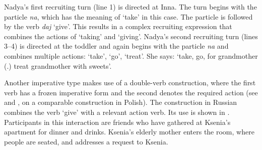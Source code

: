 \documentclass[output=paper,modfonts,nonflat]{langsci/langscibook}
\begin{document}
Nadya's first recruiting turn (line 1) is directed at Inna. The turn begins with the particle \textit{na}, which has the meaning of ‘take’ in this case. The particle is followed by the verb \textit{daj} ‘give’. This results in a complex recruiting expression that combines the actions of ‘taking’ and ‘giving’. Nadya's second recruiting turn (lines 3--4) is directed at the toddler and again begins with the particle \textit{na} and combines multiple actions: ‘take’, ‘go’, ‘treat’. She says: ‘take, go, for grandmother (.) treat grandmother with sweets’.

Another imperative type makes use of a double-verb construction, where the first verb has a frozen imperative form and the second denotes the required action (see \citealt{Zinken2013} and ,  on a comparable construction in Polish). The construction in Russian combines the verb ‘give’ with a relevant action verb. Its use is shown in . Participants in this interaction are friends who have gathered at Ksenia’s apartment for dinner and drinks. Ksenia’s elderly mother enters the room, where people are seated, and addresses a request to Ksenia.
\end{document}
